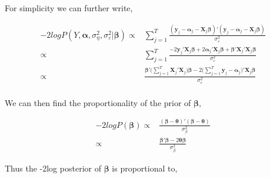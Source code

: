 \documentclass[
]{article}
\begin{document}
For simplicity we can further write,

\begin{equation*}
\begin{aligned}
-2logP(Y, \boldsymbol{\alpha}, \sigma^2_\eta, \sigma^2_\varepsilon|\boldsymbol{\beta}) \propto & \sum^T_{j=1}\frac{ (\boldsymbol{y}_j - \boldsymbol{\alpha}_j - \boldsymbol{X}_j\boldsymbol{\beta})' (\boldsymbol{y}_j - \boldsymbol{\alpha}_j - \boldsymbol{X}_j\boldsymbol{\beta})}{\sigma^2_\varepsilon}\\
\propto & \sum^T_{j=1}\frac{-2\boldsymbol{y}_j'\boldsymbol{X}_j\boldsymbol{\beta} +2\boldsymbol{\alpha}_j'\boldsymbol{X}_j\boldsymbol{\beta} + \boldsymbol{\beta}'\boldsymbol{X}_j'\boldsymbol{X}_j\boldsymbol{\beta}}{\sigma^2_\varepsilon}\\
\propto & \frac{\boldsymbol{\beta}'\big(\sum^T_{j=1}\boldsymbol{X}_j'\boldsymbol{X}_j\big)\boldsymbol{\beta} -2\big(\sum^T_{j=1}\boldsymbol{y}_j-\boldsymbol{\alpha}_j\big)'\boldsymbol{X}_j\boldsymbol{\beta} }{\sigma^2_\varepsilon}\\
\end{aligned}
\end{equation*}

We can then find the proportionality of the prior of \(\boldsymbol{\beta}\),

\begin{equation*}
\begin{aligned}
-2logP(\boldsymbol{\beta}) \propto & \frac{(\boldsymbol{\beta} - \boldsymbol{\theta})'(\boldsymbol{\beta}-\boldsymbol{\theta})}{\sigma^2_\beta}\\
\propto & \frac{\boldsymbol{\beta}'\boldsymbol{\beta} - 2\boldsymbol{\theta}\boldsymbol{\beta}}{\sigma^2_\beta}
\end{aligned}
\end{equation*}

Thus the -2log posterior of \(\boldsymbol{\beta}\) is proportional to,
\end{document}
